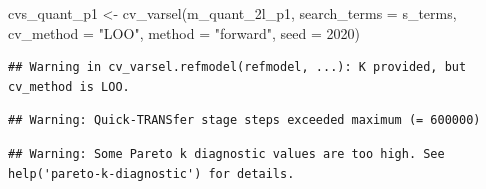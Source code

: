 \documentclass[
]{article}
\newenvironment{Shaded}{\begin{snugshade}}{\end{snugshade}}
\newcommand{\AttributeTok}[1]{\textcolor[rgb]{0.77,0.63,0.00}{#1}}
\newcommand{\DecValTok}[1]{\textcolor[rgb]{0.00,0.00,0.81}{#1}}
\newcommand{\FunctionTok}[1]{\textcolor[rgb]{0.00,0.00,0.00}{#1}}
\newcommand{\NormalTok}[1]{#1}
\newcommand{\OtherTok}[1]{\textcolor[rgb]{0.56,0.35,0.01}{#1}}
\newcommand{\StringTok}[1]{\textcolor[rgb]{0.31,0.60,0.02}{#1}}
\begin{document}
\begin{Shaded}
\begin{Highlighting}[]
\NormalTok{cvs\_quant\_p1 }\OtherTok{\textless{}{-}} \FunctionTok{cv\_varsel}\NormalTok{(m\_quant\_2l\_p1, }
                          \AttributeTok{search\_terms =}\NormalTok{ s\_terms, }
                          \AttributeTok{cv\_method =} \StringTok{"LOO"}\NormalTok{, }\AttributeTok{method =} \StringTok{"forward"}\NormalTok{, }
                          \AttributeTok{seed =} \DecValTok{2020}\NormalTok{)}
\end{Highlighting}
\end{Shaded}

\begin{verbatim}
## Warning in cv_varsel.refmodel(refmodel, ...): K provided, but cv_method is LOO.
\end{verbatim}

\begin{verbatim}
## Warning: Quick-TRANSfer stage steps exceeded maximum (= 600000)
\end{verbatim}

\begin{verbatim}
## Warning: Some Pareto k diagnostic values are too high. See help('pareto-k-diagnostic') for details.
\end{verbatim}
\end{document}
